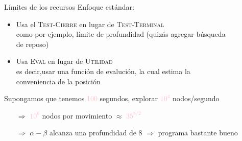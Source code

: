 \begin{frame}{Límites de los recursos}
	Enfoque estándar:
	\begin{itemize}
  		\item Usa el \textsc{Test-Cierre} en lugar de \textsc{Test-Terminal} 
  		\\
  		\quad como por ejemplo, límite de profundidad (quizás agregar \textcolor{DarkPurple}				{búsqueda \\ \quad de reposo})
	    \item Usa \textsc{Eval} en lugar de \textsc{Utilidad}
	    \\
	    \quad es decir,usar una \textcolor{DarkPurple}{función de evalución}, la cual estima la \\
	    \quad conveniencia de la posición
	\end{itemize}
	Supongamos que tenemos \textcolor{Pink}{100} segundos, explorar \textcolor{Pink}{$10^4$} nodos/segundo
	\begin{itemize}
		\item[$\Rightarrow$] \textcolor{Pink}{$10^6$} nodos por movimiento {$\approx$} \textcolor{Pink}{$35^{8/2}$} 
		\item[$\Rightarrow$] {$\alpha - \beta$} alcanza una profundidad de 8 {$\Rightarrow$} programa bastante bueno
	\end{itemize}
\end{frame}